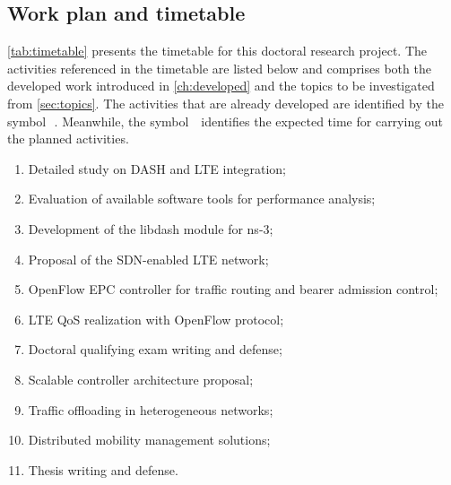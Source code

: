 \subsection{Work plan and timetable}
\label{sec:timetable}

\autoref{tab:timetable} presents the timetable for this doctoral research
project. The activities referenced in the timetable are listed below and
comprises both the developed work introduced in \autoref{ch:developed} and the
topics to be investigated from \autoref{sec:topics}. The activities that are
already developed are identified by the symbol~\,\m. Meanwhile, the symbol
\,\x\, identifies the expected time for carrying out the planned activities.

\begin{enumerate}
	\itemsep0pt
  \item Detailed study on \ac{DASH} and \ac{LTE} integration;
  \item Evaluation of available software tools for performance analysis;
  \item Development of the libdash module for \ac{ns-3};
  \item Proposal of the \ac{SDN}-enabled \ac{LTE} network;
  \item OpenFlow \ac{EPC} controller for traffic routing and bearer admission
        control;
  \item \ac{LTE} \ac{QoS} realization with OpenFlow protocol;
  \item Doctoral qualifying exam writing and defense;
  \item Scalable controller architecture proposal;
  \item Traffic offloading in heterogeneous networks;
  \item Distributed mobility management solutions;
  \item Thesis writing and defense.
\end{enumerate}

